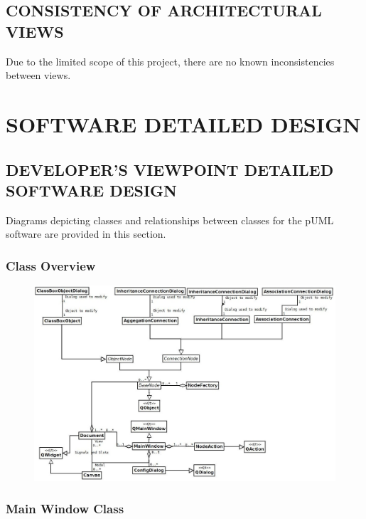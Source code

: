 \documentclass[twoside,letterpaper]{article}
\begin{document}
{\subsection[CONSISTENCY OF ARCHITECTURAL VIEWS]
{\bfseries CONSISTENCY OF ARCHITECTURAL VIEWS}
{
Due to the limited scope of this project, there are no known inconsistencies between views. 
}


\clearpage
\section{SOFTWARE DETAILED DESIGN}

\bigskip

\subsection[\ DEVELOPER{\textquoteright}S VIEWPOINT DETAILED SOFTWARE DESIGN]
{DEVELOPER{\textquoteright}S VIEWPOINT DETAILED SOFTWARE DESIGN }
{
Diagrams depicting classes and relationships between classes for the pUML software are provided in this section.
}

\subsubsection[\ Class Overview]
{\bfseries Class Overview}

\begin{figure}[h]
\centering
\includegraphics[width=6.5in]{class_simple.jpeg}
\end{figure}

\clearpage
\subsubsection[\ Main Window Class ]
{\bfseries Main Window Class }

}
\end{document}
